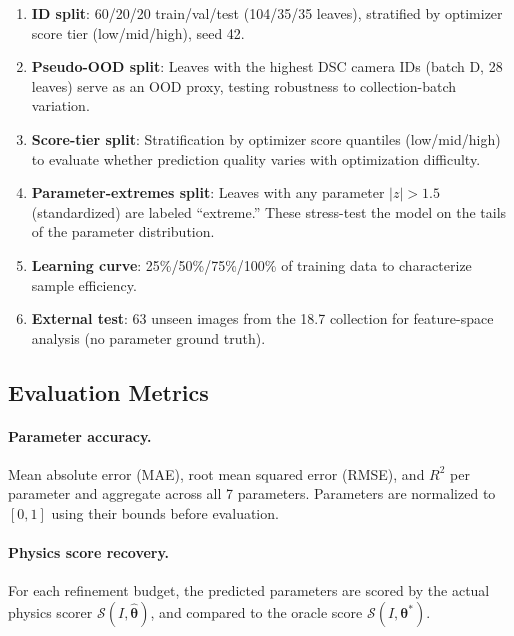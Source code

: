 \documentclass[11pt,a4paper]{article}
\newcommand{\btheta}{\boldsymbol{\theta}}
\newcommand{\cS}{\mathcal{S}}
\begin{document}
\begin{enumerate}[leftmargin=*,itemsep=2pt,label=(\Alph*)]
\item \textbf{ID split}: 60/20/20 train/val/test (104/35/35 leaves),
  stratified by optimizer score tier (low/mid/high), seed 42.

\item \textbf{Pseudo-OOD split}: Leaves with the highest DSC camera IDs
  (batch D, 28 leaves) serve as an OOD proxy, testing robustness to
  collection-batch variation.

\item \textbf{Score-tier split}: Stratification by optimizer score quantiles
  (low/mid/high) to evaluate whether prediction quality varies with
  optimization difficulty.

\item \textbf{Parameter-extremes split}: Leaves with any parameter
  $|z| > 1.5$ (standardized) are labeled ``extreme.''
  These stress-test the model on the tails of the parameter distribution.

\item \textbf{Learning curve}: 25\%/50\%/75\%/100\% of training data
  to characterize sample efficiency.

\item \textbf{External test}: 63 unseen images from the 18.7 collection
  for feature-space analysis (no parameter ground truth).
\end{enumerate}

\subsection{Evaluation Metrics}

\paragraph{Parameter accuracy.}
Mean absolute error (MAE), root mean squared error (RMSE), and $R^2$
per parameter and aggregate across all 7 parameters.
Parameters are normalized to $[0, 1]$ using their bounds before evaluation.

\paragraph{Physics score recovery.}
For each refinement budget, the predicted parameters are scored by the
actual physics scorer $\cS(I, \hat{\btheta})$, and compared to
the oracle score $\cS(I, \btheta^*)$.
\end{document}
